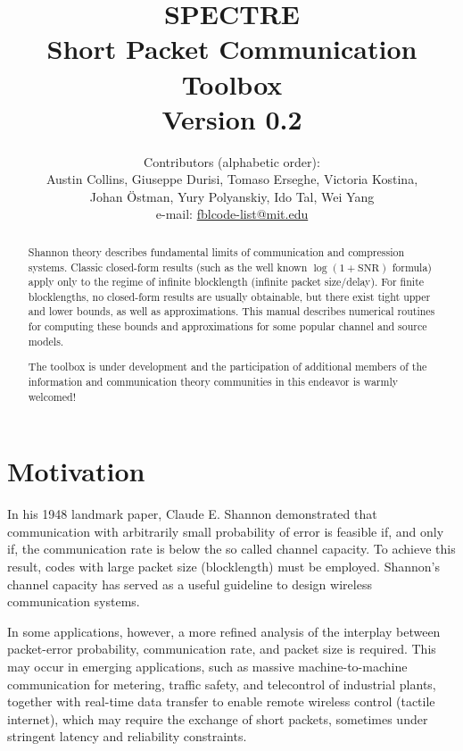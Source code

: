 \documentclass[a4paper,11p]{memoir}
\begin{document}
\title{SPECTRE\\
Short Packet Communication Toolbox\\[1cm]
Version 0.2}

\author{Contributors (alphabetic order):\\
Austin Collins, Giuseppe Durisi, Tomaso Erseghe, Victoria Kostina, \\Johan \"Ostman, Yury Polyanskiy, Ido Tal, Wei Yang\\[10pt]
e-mail: \url{fblcode-list@mit.edu}}




\maketitle

\begin{abstract}

Shannon theory describes fundamental limits of communication and
compression systems. Classic closed-form results
(such as the well known $\log(1+\mathrm{SNR})$ formula)   apply only to the regime of infinite blocklength
(infinite packet size/delay). For finite blocklengths, no closed-form results are usually
obtainable, but there  exist tight upper and lower bounds, as well as
approximations. This manual describes numerical routines for  computing
these bounds and approximations for some popular channel and
source models.

The toolbox is under development and the participation of additional
members of the information and communication theory communities in
this endeavor is warmly welcomed!
\end{abstract}
\newpage
\tableofcontents

\newpage
\chapter{Motivation}
%
  In his 1948 landmark paper, Claude E. Shannon demonstrated that communication with arbitrarily small probability of error is feasible if, and only if, the communication rate is below the so called channel capacity. 
  To achieve this result, codes with large packet size (blocklength) must be employed. 
 Shannon's channel capacity has served as a useful guideline to design wireless communication systems.

In some applications, however, a more refined analysis of the interplay between packet-error probability, communication rate, and packet size is required.
  This may occur in emerging applications, such as massive machine-to-machine communication for metering, traffic safety, and telecontrol of industrial plants, together with real-time data transfer to enable remote wireless control (tactile internet), which may require the exchange of short packets, sometimes under stringent latency and reliability constraints.
  
\end{document}
